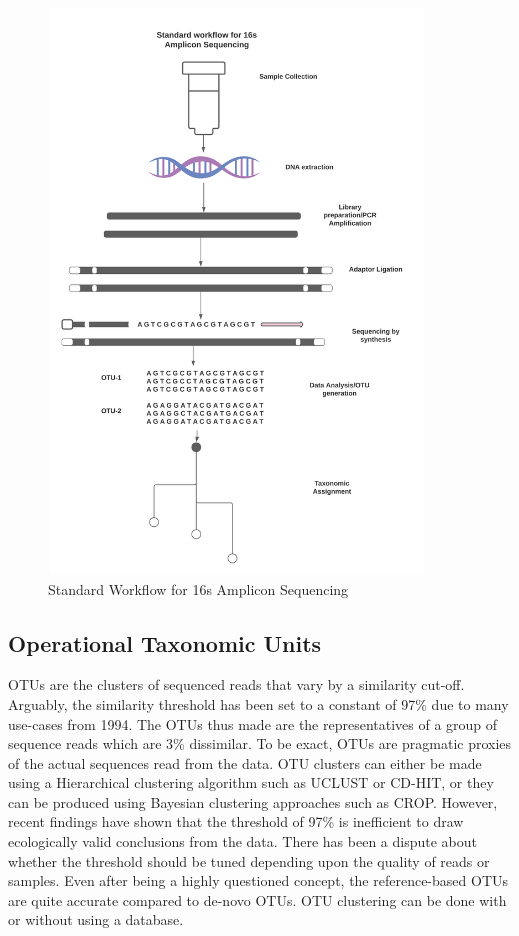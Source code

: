 \begin{figure}[!hb]
  \centering
  \includegraphics[width=10cm, height=15cm]{../figures/Figure3.png}
  \caption{Standard Workflow for 16s Amplicon Sequencing}
  \label{fig:figure3}
\end{figure}

\subsection*{Operational Taxonomic Units}
OTUs are the clusters of sequenced reads that vary by a similarity cut-off. Arguably, the similarity threshold has been set to a constant of 97\% due to many use-cases from 1994. The OTUs thus made are the representatives of a group of sequence reads which are 3\% dissimilar. To be exact, OTUs are pragmatic proxies of the actual sequences read from the data. OTU clusters can either be made using a Hierarchical clustering algorithm such as UCLUST or CD-HIT, or they can be produced using Bayesian clustering approaches such as CROP. However, recent findings have shown that the threshold of 97\% is inefficient to draw ecologically valid conclusions from the data. There has been a dispute about whether the threshold should be tuned depending upon the quality of reads or samples. Even after being a highly questioned concept, the reference-based OTUs are quite accurate compared to de-novo OTUs. OTU clustering can be done with or without using a database. 

